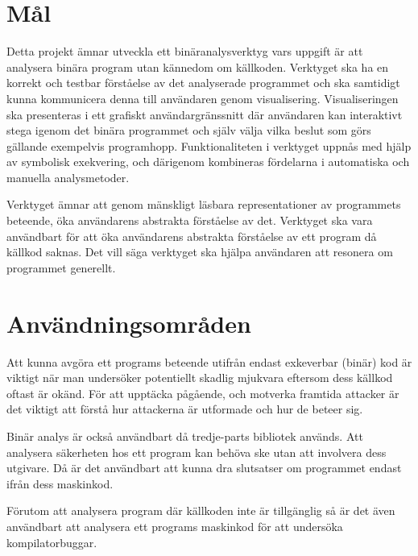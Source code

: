 
\section{Mål}
Detta projekt ämnar utveckla ett binäranalysverktyg vars uppgift är att
analysera binära program utan kännedom om källkoden. Verktyget ska ha en korrekt
och testbar förståelse av det analyserade programmet och ska samtidigt kunna
kommunicera denna till användaren genom visualisering. Visualiseringen ska
presenteras i ett grafiskt användargränssnitt där användaren kan interaktivt
stega igenom det binära programmet och själv välja vilka beslut som görs 
gällande exempelvis programhopp. Funktionaliteten i verktyget uppnås med hjälp
av symbolisk exekvering, och därigenom kombineras fördelarna i automatiska och 
manuella analysmetoder.

Verktyget ämnar att genom mänskligt läsbara representationer av programmets 
beteende, öka användarens abstrakta förståelse av det. Verktyget ska vara 
användbart för att öka användarens abstrakta förståelse av ett program då källkod 
saknas. Det vill säga verktyget ska hjälpa användaren att resonera om programmet 
generellt. 

\section{Användningsområden}
Att kunna avgöra ett programs beteende utifrån endast exkeverbar (binär) 
kod är viktigt när man undersöker potentiellt skadlig mjukvara eftersom
dess källkod oftast är okänd. För att upptäcka pågående, och motverka 
framtida attacker är det viktigt att förstå hur attackerna är utformade och
hur de beteer sig. 

Binär analys är också användbart då tredje-parts bibliotek används.
Att analysera säkerheten hos ett program kan behöva ske utan att involvera 
dess utgivare. Då är det användbart att kunna dra slutsatser om programmet 
endast ifrån dess maskinkod. 

Förutom att analysera program där källkoden inte är tillgänglig så är det även 
användbart att analysera ett programs maskinkod för att undersöka kompilatorbuggar.





